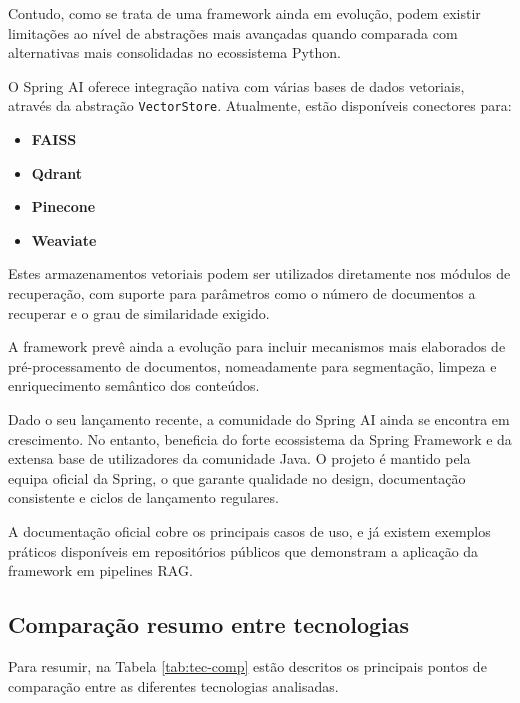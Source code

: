 Contudo, como se trata de uma framework ainda em evolução, podem existir limitações ao nível de abstrações mais avançadas quando comparada com alternativas mais consolidadas no ecossistema Python.


O Spring AI oferece integração nativa com várias bases de dados vetoriais, através da abstração \texttt{VectorStore}. Atualmente, estão disponíveis conectores para:

\begin{itemize} \item \textbf{FAISS} \item \textbf{Qdrant} \item \textbf{Pinecone} \item \textbf{Weaviate} \end{itemize}

Estes armazenamentos vetoriais podem ser utilizados diretamente nos módulos de recuperação, com suporte para parâmetros como o número de documentos a recuperar e o grau de similaridade exigido.

A framework prevê ainda a evolução para incluir mecanismos mais elaborados de pré-processamento de documentos, nomeadamente para segmentação, limpeza e enriquecimento semântico dos conteúdos.


Dado o seu lançamento recente, a comunidade do Spring AI ainda se encontra em crescimento. No entanto, beneficia do forte ecossistema da Spring Framework e da extensa base de utilizadores da comunidade Java. O projeto é mantido pela equipa oficial da Spring, o que garante qualidade no design, documentação consistente e ciclos de lançamento regulares.

A documentação oficial cobre os principais casos de uso, e já existem exemplos práticos disponíveis em repositórios públicos que demonstram a aplicação da framework em pipelines RAG.


\subsection{Comparação resumo entre tecnologias}


Para resumir, na Tabela \ref{tab:tec-comp} estão descritos os principais pontos de comparação entre as diferentes tecnologias analisadas. 

